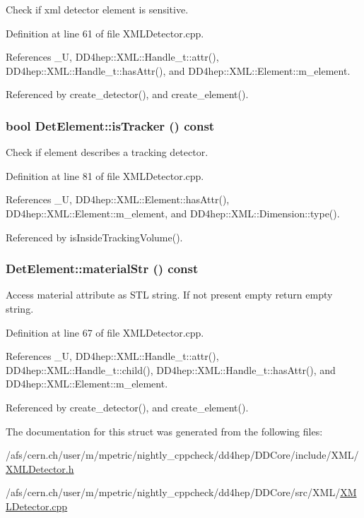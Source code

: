 Check if xml detector element is sensitive. 

Definition at line 61 of file XMLDetector.cpp.

References \_\-U, DD4hep::XML::Handle\_\-t::attr(), DD4hep::XML::Handle\_\-t::hasAttr(), and DD4hep::XML::Element::m\_\-element.

Referenced by create\_\-detector(), and create\_\-element().\hypertarget{struct_d_d4hep_1_1_x_m_l_1_1_det_element_a3e0b3b6cf5350fe0eba2ea16eab04736}{
\subsubsection[{isTracker}]{\setlength{\rightskip}{0pt plus 5cm}bool DetElement::isTracker () const}}
\label{struct_d_d4hep_1_1_x_m_l_1_1_det_element_a3e0b3b6cf5350fe0eba2ea16eab04736}


Check if element describes a tracking detector. 

Definition at line 81 of file XMLDetector.cpp.

References \_\-U, DD4hep::XML::Element::hasAttr(), DD4hep::XML::Element::m\_\-element, and DD4hep::XML::Dimension::type().

Referenced by isInsideTrackingVolume().\hypertarget{struct_d_d4hep_1_1_x_m_l_1_1_det_element_a4e26d21d5a57f5c02d69dc36cc9d6492}{
\subsubsection[{materialStr}]{ DetElement::materialStr () const}}
\label{struct_d_d4hep_1_1_x_m_l_1_1_det_element_a4e26d21d5a57f5c02d69dc36cc9d6492}


Access material attribute as STL string. If not present empty return empty string. 

Definition at line 67 of file XMLDetector.cpp.

References \_\-U, DD4hep::XML::Handle\_\-t::attr(), DD4hep::XML::Handle\_\-t::child(), DD4hep::XML::Handle\_\-t::hasAttr(), and DD4hep::XML::Element::m\_\-element.

Referenced by create\_\-detector(), and create\_\-element().

The documentation for this struct was generated from the following files:\begin{DoxyCompactItemize}
\item 
/afs/cern.ch/user/m/mpetric/nightly\_\-cppcheck/dd4hep/DDCore/include/XML/\hyperlink{_x_m_l_detector_8h}{XMLDetector.h}\item 
/afs/cern.ch/user/m/mpetric/nightly\_\-cppcheck/dd4hep/DDCore/src/XML/\hyperlink{_x_m_l_detector_8cpp}{XMLDetector.cpp}\end{DoxyCompactItemize}
